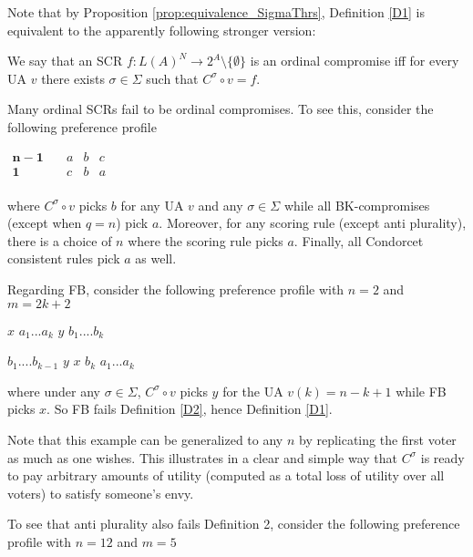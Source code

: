 \documentclass[version=3.21, pagesize, notitlepage, twoside=off, bibliography=totoc, DIV=calc, fontsize=12pt, a4paper]{scrartcl}
\begin{document}
Note that by Proposition \ref{prop:equivalence_SigmaThrs}, Definition \ref{D1} is equivalent to the apparently following stronger version:

\begin{definition}
\label{D2} We say that an SCR $f:L(A)^{N}\rightarrow 2^{A} \setminus \{\emptyset \}$ is an ordinal compromise iff for every UA $v$ there exists $\sigma \in \Sigma $ such that $C^{\sigma }\circ v=f$.
\end{definition}

\begin{example}
	\label{ex:qeqn}
Many ordinal SCRs fail to be ordinal compromises. To see this, consider the following preference profile

\begin{center}
	$
	\begin{array}{cccc}
	\mathbf{n-1} \quad &a&b&c\\
	\mathbf{1} \quad &c&b&a\\
	\end{array}
	$
\end{center}

where $C^{\sigma }\circ v$ picks $b$ for any UA $v$ and any $\sigma \in \Sigma $ while all BK-compromises (except when $q=n$) pick $a$. Moreover, for any scoring rule (except anti plurality), there is a choice of $n$ where the scoring rule picks $a$. Finally, all Condorcet consistent rules pick $a$ as well.
\end{example}

Regarding FB, consider the following preference profile with $n=2$ and $m=2k+2$

\bigskip

$x$ $a_{1}...a_{k}$ $y$ $b_{1}....b_{k}$

$b_{1}....b_{k-1}$ $y$ $x$ $b_{k}$ $a_{1}...a_{k}$

\bigskip

where under any $\sigma \in \Sigma $, $C^{\sigma }\circ v$ picks $y$ for the UA $v(k)=n-k+1$ while FB picks $x$. So FB fails Definition \ref{D2}, hence Definition \ref{D1}.

Note that this example can be generalized to any $n$ by replicating the first voter as much as one wishes. This illustrates in a clear and simple
way that $C^{\sigma }$ is ready to pay arbitrary amounts of utility (computed as a total loss of utility over all voters) to satisfy someone's envy.

To see that anti plurality also fails Definition 2, consider the following preference profile with $n=12$ and $m=5$
\end{document}
